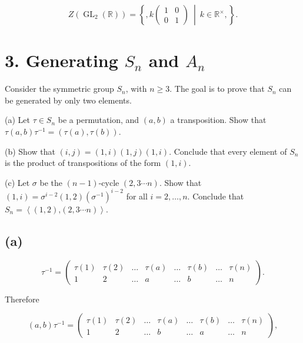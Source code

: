 \[Z\left( {\operatorname{GL}_{2}\left( \mathbb{R} \right)} \right) = \left\{ ,k\begin{pmatrix}
1 & 0 \\
0 & 1
\end{pmatrix}\  \middle| \ k \in \mathbb{R}^{\times}, \right\}.\]

\section{\texorpdfstring{3. Generating \(S_{n}\) and \(A_{n}\)}{3. Generating S\_\{n\} and A\_\{n\}}}

Consider the symmetric group \(S_{n}\), with \(n \geq 3\). The goal is to prove that \(S_{n}\) can be generated by only two elements.

(a) Let \(\tau \in S_{n}\) be a permutation, and \(\left( {a,b} \right)\) a transposition. Show that \(\tau\left( {a,b} \right)\tau^{- 1} = \left( {\tau(a),\tau(b)} \right)\).

(b) Show that \(\left( {i,j} \right) = \left( {1,i} \right)\left( {1,j} \right)\left( {1,i} \right)\). Conclude that every element of \(S_{n}\) is the product of transpositions of the form \(\left( {1,i} \right)\).

(c) Let \(\sigma\) be the \(\left( {n - 1} \right)\)-cycle \(\left( {2,3\cdots n} \right)\). Show that \(\left( {1,i} \right) = \sigma^{i - 2}\left( {1,2} \right)\left( \sigma^{- 1} \right)^{i - 2}\) for all \(i = 2,\ldots,n\). Conclude that \(S_{n} = \left\langle {\left( {1,2} \right)\text{,}\left( {2,3\cdots n} \right)} \right\rangle\).

\subsection{(a)}

\[\tau^{- 1} = \begin{pmatrix}
{\tau(1)} & {\tau(2)} & \ldots & {\tau(a)} & \ldots & {\tau(b)} & \ldots & {\tau(n)} \\
1 & 2 & \ldots & a & \ldots & b & \ldots & n
\end{pmatrix}.\]

Therefore

\[\left( {a,b} \right)\tau^{- 1} = \begin{pmatrix}
{\tau(1)} & {\tau(2)} & \ldots & {\tau(a)} & \ldots & {\tau(b)} & \ldots & {\tau(n)} \\
1 & 2 & \ldots & b & \ldots & a & \ldots & n
\end{pmatrix},\]

